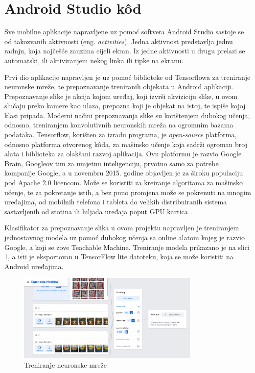 \section{Android Studio kôd}
Sve mobilne aplikacije napravljene uz pomoć softvera Android Studio sastoje se od takozvanih aktivnosti (eng. \textit{activities}). Jedna aktivnost predstavlja jednu radnju, koja najčešće zauzima cijeli ekran. Iz jedne aktivnosti u drugu prelazi se automatski, ili aktiviranjem nekog linka ili tipke na ekranu.

Prvi dio aplikacije napravljen je uz pomoć biblioteke od Tensorflowa za treniranje neuronske mreže, te prepoznavanje treniranih objekata u Android aplikaciji. Prepoznavanje slike je akcija kojom uređaj, koji izvrši akviziciju slike, u ovom slučaju preko kamere kao ulaza, prepozna koji je objekat na istoj, te ispiše kojoj klasi pripada. Moderni načini prepoznavanja slike su korištenjem dubokog učenja, odnosno, treniranjem konvolutivnih neuronskih mreža na ogromnim bazama podataka. Tensorflow, korišten za izradu programa, je \textit{open-source} platforma, odnosno platforma otvorenog kôda, za mašinsko učenje koja sadrži ogroman broj alata i biblioteka za olakšani razvoj aplikacija. Ovu platformu je razvio Google Brain, Googleov tim za umjetnu inteligenciju, prvotno samo za potrebe kompanije Google, a u novembru 2015. godine objavljen je za široku populaciju pod Apache 2.0 licencom. Može se koristiti za kreiranje algoritama za mašinsko učenje, te za pokretanje istih, a bez puno promjena može se pokrenuti na mnogim uređajima, od mobilnih telefona i tableta do velikih distribuiranih sistema sastavljenih od stotina ili hiljada uređaja poput GPU kartica \cite{Tensorflow}. 

Klasifikator za prepoznavanje slika u ovom projektu napravljen je treniranjem jednostavnog modela uz pomoć dubokog učenja sa online alatom kojeg je razvio Google, a koji se zove Teachable Machine. Treniranje modela prikazano je na slici \ref{fig:Slika_Treniranje}, a isti je eksportovan u TensorFlow lite datoteku, koja se može koristiti na Android uređajima.
\begin{figure}[h!]
  \centering
  \includegraphics[width=0.8\textwidth]{treniranje.png}
  \caption{Treniranje neuronske mreže}
  \label{fig:Slika_Treniranje}
\end{figure}

